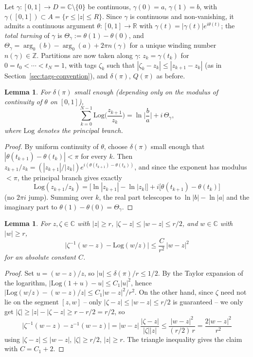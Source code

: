 \documentclass[11pt,fleqn]{article}
\def\C{\mathbb C}
\def\R{\mathbb R}
\def\Z{\mathbb Z}
\theoremstyle{plain}
\newtheorem{lemma}[thm]{Lemma}
\theoremstyle{remark}
\begin{document}
Let $\gamma:[0,1]\to D=\C\setminus\{0\}$ be continuous, $\gamma(0)=a$,
$\gamma(1)=b$, with $\gamma([0,1])\subset A=\{r\le|z|\le R\}$. Since
$\gamma$ is continuous and non-vanishing, it admits a continuous argument
$\theta:[0,1]\to\R$ with $\gamma(t)=|\gamma(t)|e^{i\theta(t)}$; the
\emph{total turning} of $\gamma$ is $\Theta_\gamma:=\theta(1)-\theta(0)$,
and $\Theta_\gamma=\arg_0(b)-\arg_0(a)+2\pi n(\gamma)$ for a unique winding
number $n(\gamma)\in\Z$. Partitions are now taken along $\gamma$:
$z_k=\gamma(t_k)$ for $0=t_0<\cdots<t_N=1$, with tags $\zeta_k$ such that
$|\zeta_k-z_k|\le|z_{k+1}-z_k|$ (as in Section~\ref{sec:tags-convention}), and $\delta(\pi)$,
$Q(\pi)$ as before.

\begin{lemma}\label{lem:logtel}
For $\delta(\pi)$ small enough (depending only on the modulus of
continuity of $\theta$ on $[0,1]$),
\[
\sum_{k=0}^{N-1}\mathrm{Log}\Big(\frac{z_{k+1}}{z_k}\Big)
=\ln\Big|\frac ba\Big|+i\,\Theta_\gamma,
\]
where $\mathrm{Log}$ denotes the principal branch.
\end{lemma}
\begin{proof}
By uniform continuity of $\theta$, choose $\delta(\pi)$ small enough that
$|\theta(t_{k+1})-\theta(t_k)|<\pi$ for every $k$. Then
$z_{k+1}/z_k=(|z_{k+1}|/|z_k|)e^{i(\theta(t_{k+1})-\theta(t_k))}$, and
since the exponent has modulus $<\pi$, the principal branch gives exactly
\[
\mathrm{Log}(z_{k+1}/z_k)=\big[\ln|z_{k+1}|-\ln|z_k|\big]
+i\big[\theta(t_{k+1})-\theta(t_k)\big]
\]
(no $2\pi i$ jump). Summing over $k$, the real part telescopes to
$\ln|b|-\ln|a|$ and the imaginary part to $\theta(1)-\theta(0)=\Theta_\gamma$.
\end{proof}

\begin{lemma}\label{lem:logest}
For $z,\zeta\in\C$ with $|z|\ge r$, $|\zeta-z|\le|w-z|\le r/2$, and
$w\in\C$ with $|w|\ge r$,
\[
\big|\zeta^{-1}(w-z)-\mathrm{Log}(w/z)\big|\le\frac C{r^2}\,|w-z|^2
\]
for an absolute constant $C$.
\end{lemma}
\begin{proof}
Set $u=(w-z)/z$, so $|u|\le\delta(\pi)/r\le1/2$. By the Taylor expansion
of the logarithm, $|\mathrm{Log}(1+u)-u|\le C_1|u|^2$, hence
$|\mathrm{Log}(w/z)-(w-z)/z|\le C_1|w-z|^2/r^2$. On the other hand, since
$\zeta$ need not lie on the segment $[z,w]$ -- only
$|\zeta-z|\le|w-z|\le r/2$ is guaranteed -- we only get
$|\zeta|\ge|z|-|\zeta-z|\ge r-r/2=r/2$, so
\[
\big|\zeta^{-1}(w-z)-z^{-1}(w-z)\big|=|w-z|\,\frac{|\zeta-z|}{|\zeta||z|}
\le\frac{|w-z|^2}{(r/2)\,r}=\frac{2|w-z|^2}{r^2}
\]
using $|\zeta-z|\le|w-z|$, $|\zeta|\ge r/2$, $|z|\ge r$. The triangle
inequality gives the claim with $C=C_1+2$.
\end{proof}
\end{document}
